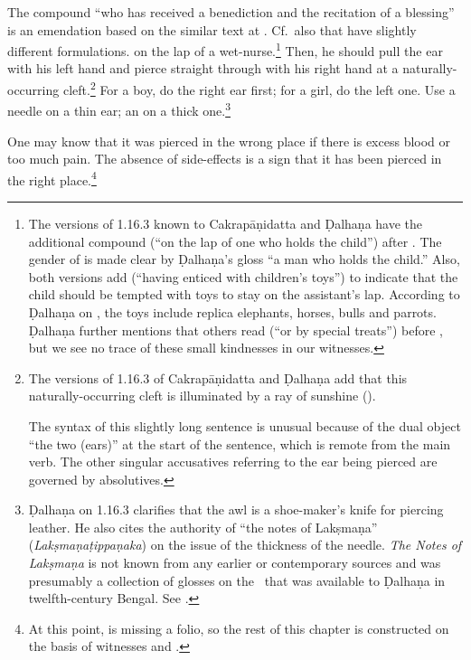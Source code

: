 \begin{translation}
{The compound  “who has received a benediction and
the recitation of a blessing” is an emendation based on the similar text at
.  Cf.\ also  that have slightly
different formulations.} on the lap of a wet-nurse.\footnote{The versions of
    1.16.3 known to Cakrapāṇidatta \citep[126]{acar-1939} and Ḍalhaṇa
    \citep[76]{vulgate} have the additional compound  (“on the
    lap of one who holds the child”) after . The gender of
     is made clear by  Ḍalhaṇa's gloss “a man who holds the child.”
    Also, both versions add  (“having enticed with
    children's toys”) to indicate that the child should be tempted with toys to stay
    on the assistant's lap. According to Ḍalhaṇa on , the toys include
    replica elephants, horses, bulls and parrots. Ḍalhaṇa further mentions that others
    read  (“or by special treats”) before
    , but we see no trace of these small kindnesses in our
    witnesses.} Then, he should pull the ear with his left hand 
    and pierce straight through with his right hand at a naturally-occurring
    cleft.\footnote{The versions of 1.16.3 of Cakrapāṇidatta \citep[126]{acar-1939}
        and Ḍalhaṇa \citep[76]{vulgate} add that this naturally-occurring cleft is
        illuminated by a ray of sunshine  ().

The syntax of this slightly long sentence is unusual because of the dual
object  “the two (ears)” at the start of the sentence, which is remote
from the main verb.  The other singular accusatives referring to the ear being
pierced are governed by absolutives.} For a boy, do the right ear first; for a
girl, do the left one. Use a needle on a thin ear; an  on a thick
one.\footnote{Ḍalhaṇa on 1.16.3 \citep[76]{vulgate} clarifies that the awl is a
    shoe-maker's knife for piercing leather.  He also cites the authority of “the
    notes of Lakṣmaṇa” (\emph{Lakṣmaṇaṭippaṇaka}) on the issue of the thickness of the
    needle. \textit{The Notes of Lakṣmaṇa} is not known from any earlier or
    contemporary sources and was presumably a collection of glosses on the \SS\ that
    was available to Ḍalhaṇa in twelfth-century Bengal. See \citet[IA,
    386]{meul-hist}.}
    
    
\item [3]  
    
One may know that it was pierced in the wrong place if there is excess blood or
too much pain. The absence of side-effects is a sign that it has been pierced in the right
place.\footnote{At this point,  is missing a folio, so
    the rest of this chapter is constructed on the basis of witnesses
     and .}
    

\end{translation}
